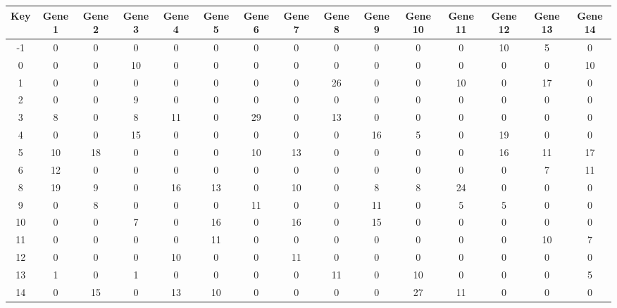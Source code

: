 \begin{tabular}{|c|c|c|c|c|c|c|c|c|c|c|c|c|c|c|}
\hline
Key & Gene 1 & Gene 2 & Gene 3 & Gene 4 & Gene 5 & Gene 6 & Gene 7 & Gene 8 & Gene 9 & Gene 10 & Gene 11 & Gene 12 & Gene 13 & Gene 14 \\
\hline
-1 & 0 & 0 & 0 & 0 & 0 & 0 & 0 & 0 & 0 & 0 & 0 & 10 & 5 & 0 \\
0 & 0 & 0 & 10 & 0 & 0 & 0 & 0 & 0 & 0 & 0 & 0 & 0 & 0 & 10 \\
1 & 0 & 0 & 0 & 0 & 0 & 0 & 0 & 26 & 0 & 0 & 10 & 0 & 17 & 0 \\
2 & 0 & 0 & 9 & 0 & 0 & 0 & 0 & 0 & 0 & 0 & 0 & 0 & 0 & 0 \\
3 & 8 & 0 & 8 & 11 & 0 & 29 & 0 & 13 & 0 & 0 & 0 & 0 & 0 & 0 \\
4 & 0 & 0 & 15 & 0 & 0 & 0 & 0 & 0 & 16 & 5 & 0 & 19 & 0 & 0 \\
5 & 10 & 18 & 0 & 0 & 0 & 10 & 13 & 0 & 0 & 0 & 0 & 16 & 11 & 17 \\
6 & 12 & 0 & 0 & 0 & 0 & 0 & 0 & 0 & 0 & 0 & 0 & 0 & 7 & 11 \\
8 & 19 & 9 & 0 & 16 & 13 & 0 & 10 & 0 & 8 & 8 & 24 & 0 & 0 & 0 \\
9 & 0 & 8 & 0 & 0 & 0 & 11 & 0 & 0 & 11 & 0 & 5 & 5 & 0 & 0 \\
10 & 0 & 0 & 7 & 0 & 16 & 0 & 16 & 0 & 15 & 0 & 0 & 0 & 0 & 0 \\
11 & 0 & 0 & 0 & 0 & 11 & 0 & 0 & 0 & 0 & 0 & 0 & 0 & 10 & 7 \\
12 & 0 & 0 & 0 & 10 & 0 & 0 & 11 & 0 & 0 & 0 & 0 & 0 & 0 & 0 \\
13 & 1 & 0 & 1 & 0 & 0 & 0 & 0 & 11 & 0 & 10 & 0 & 0 & 0 & 5 \\
14 & 0 & 15 & 0 & 13 & 10 & 0 & 0 & 0 & 0 & 27 & 11 & 0 & 0 & 0 \\
\hline
\end{tabular}